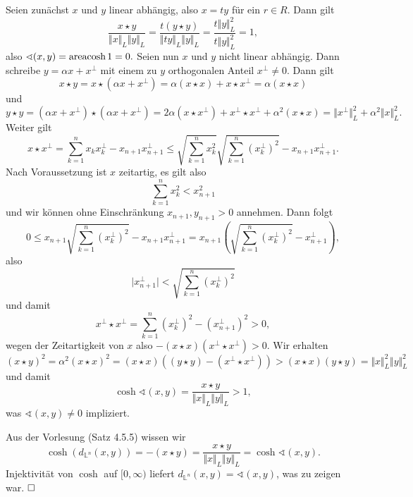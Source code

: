 \documentclass[11pt]{book}
\numberwithin{dummy}{section}
\theoremstyle{nonumberbreak}
\newenvironment{prob}[1][]{\ifthenelse{\equal{#1}{}}{\problem}{\problem[#1]}\rm}{\endproblem}
\newenvironment{sol}[1][]{\ifthenelse{\equal{#1}{}}{\solution}{\solution[#1]}\rm}{\endsolution}
\newcommand{\Loid}{\mathbb{L}}
\begin{document}
\begin{spacing}{1.4}
\begin{prob}
\begin{sol}
\begin{compactenum}
\item Seien zunächst $x$ und $y$ linear abhängig, also $x=ty$ für ein $r \in R$. Dann gilt 
$$\frac{x\star y}{\Vert x \Vert_L \Vert y \Vert_L} = \frac{t (y \star y)}{ \Vert ty \Vert_L \Vert y \Vert_L} = \frac{t \Vert y \Vert_L^2}{t \Vert y \Vert_L^2} = 1,$$
also
$\sphericalangle(x,y) = \mathrm{areacosh} \hspace{1.5pt} 1 = 0.$
Seien nun $x$ und $y$ nicht linear abhängig. Dann schreibe $y= \alpha x + x^{\perp}$ mit einem zu $y$ orthogonalen Anteil $x^{\perp}\neq0$. Dann gilt 
$$x \star y= x \star ( \alpha x + x^{\perp}) = \alpha (x \star x) + x \star x^{\perp} = \alpha (x \star x)$$
und 
$$y \star y = (\alpha x + x^{\perp})\star (\alpha x + x^{\perp}) = 2 \alpha (x \star x^{\perp}) + x^{\perp} \star x^{\perp} + \alpha^2 (x \star x) = \Vert x^{\perp}\Vert_L^2 + \alpha^2 \Vert x \Vert_L^2.$$
Weiter gilt 
$$x \star x^{\perp} = \sum_{k=1}^n x_kx_k^{\perp} - x_{n+1}x_{n+1}^{\perp} \leqslant \sqrt{\sum_{k=1}^n x_k^2} \sqrt{\sum_{k=1}^n \left(x_k^{\perp}\right)^2} - x_{n+1}x_{n+1}^{\perp}.$$
Nach Voraussetzung ist $x$ zeitartig, es gilt also 
$$ \sum_{k=1}^n x_k^2 < x_{n+1}^2$$
 und wir können ohne Einschränkung $x_{n+1}, y_{n+1}>0$ annehmen. Dann folgt
 $$0 \leqslant x_{n+1} \sqrt{\sum_{k=1}^n \left(x_k^{\perp}\right)^2} - x_{n+1}x_{n+1}^{\perp} = x_{n+1}\left( \sqrt{\sum_{k=1}^n \left( x_k^{\perp}\right)^2} - x_{n+1}^{\perp}\right),$$
 also 
 $$\vert x_{n+1}^{\perp} \vert < \sqrt{\sum_{k=1}^n \left( x_k^{\perp}\right)^2}$$
 und damit 
 $$x^{\perp} \star x^{\perp} = \sum_{k=1}^n \left( x_k^{\perp}\right)^2 - \left(x_{n+1}^{\perp}\right)^2 >0,$$
 wegen der Zeitartigkeit von $x$ also $-(x \star x)\left( x^{\perp} \star x^{\perp}\right) >0$.
 Wir erhalten
 $$(x \star y)^2 = \alpha^2 ( x \star x)^2 = (x \star x)\left((y \star y) - (x^{\perp} \star x^{\perp})\right)> (x\star x)(y \star y) = \Vert x \Vert_L^2 \Vert y \Vert_L^2$$
und damit $$\cosh \sphericalangle (x,y) = \frac{x \star y}{\Vert x \Vert_L \Vert y \Vert_L} >1,$$
was $\sphericalangle (x,y) \neq 0$ impliziert.

\item Aus der Vorlesung (Satz 4.5.5) wissen wir 
$$ \cosh ( d_{\Loid^n}(x,y)) = - (x \star y) =\frac{x \star y}{\Vert x \Vert_L \Vert y \Vert_L} = \cosh \sphericalangle(x,y).$$
Injektivität von $\cosh$ auf $[0,\infty)$ liefert $d_{\Loid^n}(x,y)=\sphericalangle(x,y)$, was zu zeigen war. $\hfill \Box$
 



\end{compactenum}
\end{sol}
\end{prob}
\end{spacing}
\end{document}
